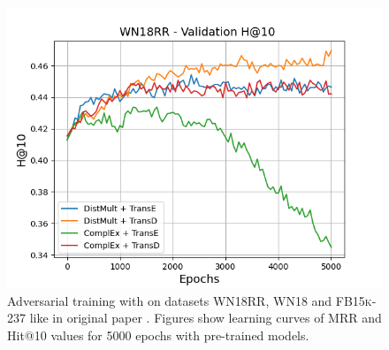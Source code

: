 \begin{figure}
\begin{minipage}{.3\textwidth}
      \includegraphics[width=0.9\linewidth]{figures/results/gan_train/pretrained/uncertainty/max/entropy/wn18rr/5k_epochs/uncertainty_wn18rr_hit10.png}
    \end{minipage}%
    \caption{Adversarial training with \usmax on datasets \textsc{WN18RR}, \textsc{WN18} and \textsc{FB15k-237} like in original \kbgan paper \cite{cai2017kbgan}.
    Figures show learning curves of MRR and Hit@10 values for 5000 epochs with pre-trained models.}
    \label{fig:gan_train_pretrained_max}
\end{figure}